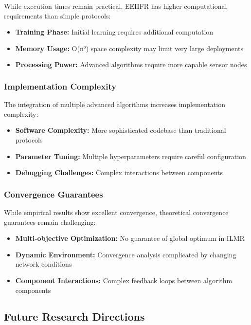 \documentclass[conference]{IEEEtran}
\begin{document}
While execution times remain practical, EEHFR has higher computational requirements than simple protocols:

\begin{itemize}
    \item \textbf{Training Phase:} Initial learning requires additional computation
    \item \textbf{Memory Usage:} O(n²) space complexity may limit very large deployments
    \item \textbf{Processing Power:} Advanced algorithms require more capable sensor nodes
\end{itemize}

\subsubsection{Implementation Complexity}

The integration of multiple advanced algorithms increases implementation complexity:

\begin{itemize}
    \item \textbf{Software Complexity:} More sophisticated codebase than traditional protocols
    \item \textbf{Parameter Tuning:} Multiple hyperparameters require careful configuration
    \item \textbf{Debugging Challenges:} Complex interactions between components
\end{itemize}

\subsubsection{Convergence Guarantees}

While empirical results show excellent convergence, theoretical convergence guarantees remain challenging:

\begin{itemize}
    \item \textbf{Multi-objective Optimization:} No guarantee of global optimum in ILMR
    \item \textbf{Dynamic Environment:} Convergence analysis complicated by changing network conditions
    \item \textbf{Component Interactions:} Complex feedback loops between algorithm components
\end{itemize}

\subsection{Future Research Directions}
\end{document}
